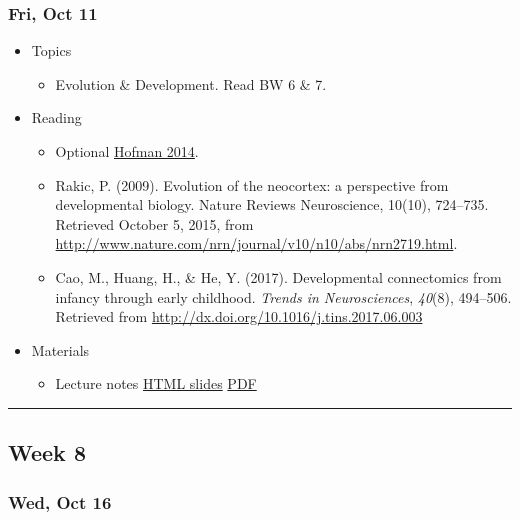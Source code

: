 \documentclass[]{article}
\providecommand{\tightlist}{%
  \setlength{\itemsep}{0pt}\setlength{\parskip}{0pt}}
\begin{document}
\hypertarget{fri-oct-11}{%
\subsubsection{Fri, Oct 11}\label{fri-oct-11}}

\begin{itemize}
\tightlist
\item
  Topics

  \begin{itemize}
  \tightlist
  \item
    Evolution \& Development. Read BW 6 \& 7.
  \end{itemize}
\item
  Reading

  \begin{itemize}
  \tightlist
  \item
    Optional
    \href{http://www.frontiersin.org/Journal/Abstract.aspx?s=742\&name=neuroanatomy\&ART_DOI=10.3389/fnana.2014.00015}{Hofman
    2014}.
  \item
    Rakic, P. (2009). Evolution of the neocortex: a perspective from
    developmental biology. Nature Reviews Neuroscience, 10(10),
    724--735. Retrieved October 5, 2015, from
    \url{http://www.nature.com/nrn/journal/v10/n10/abs/nrn2719.html}.
  \item
    Cao, M., Huang, H., \& He, Y. (2017). Developmental connectomics
    from infancy through early childhood. \emph{Trends in
    Neurosciences}, \emph{40}(8), 494--506. Retrieved from
    \url{http://dx.doi.org/10.1016/j.tins.2017.06.003}
  \end{itemize}
\item
  Materials

  \begin{itemize}
  \tightlist
  \item
    Lecture notes \textbar{} \href{}{HTML slides} \textbar{}
    \href{}{PDF}
  \end{itemize}
\end{itemize}

\begin{center}\rule{0.5\linewidth}{\linethickness}\end{center}

\hypertarget{week-8}{%
\subsection{Week 8}\label{week-8}}

\hypertarget{wed-oct-16}{%
\subsubsection{Wed, Oct 16}\label{wed-oct-16}}
\end{document}
